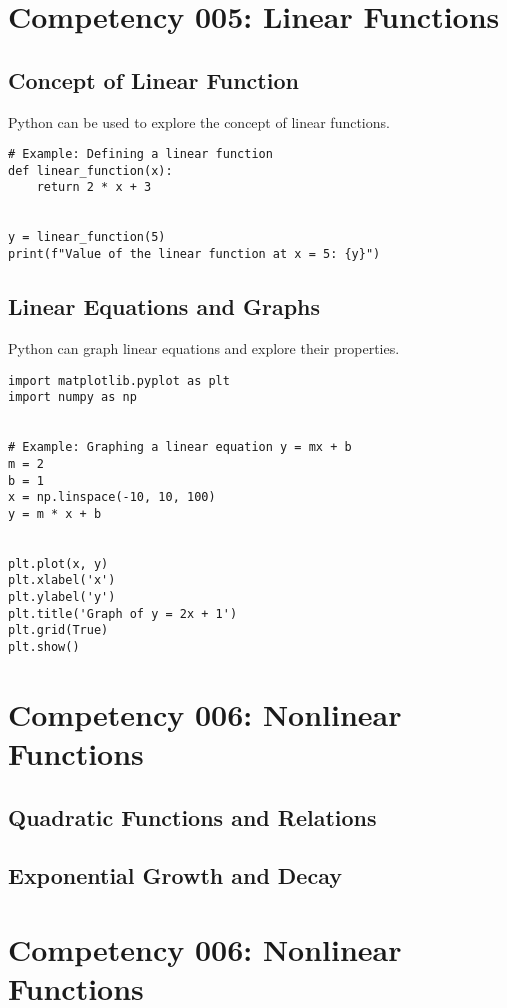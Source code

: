 \documentclass{book}
\begin{document}
\section{Competency 005: Linear Functions}
\subsection{Concept of Linear Function}
Python can be used to explore the concept of linear functions.


\begin{lstlisting}[style=pythonstyle]
# Example: Defining a linear function
def linear_function(x):
    return 2 * x + 3


y = linear_function(5)
print(f"Value of the linear function at x = 5: {y}")
\end{lstlisting}


\subsection{Linear Equations and Graphs}
Python can graph linear equations and explore their properties.


\begin{lstlisting}[style=pythonstyle]
import matplotlib.pyplot as plt
import numpy as np


# Example: Graphing a linear equation y = mx + b
m = 2
b = 1
x = np.linspace(-10, 10, 100)
y = m * x + b


plt.plot(x, y)
plt.xlabel('x')
plt.ylabel('y')
plt.title('Graph of y = 2x + 1')
plt.grid(True)
plt.show()
\end{lstlisting}



\section{Competency 006: Nonlinear Functions}
\subsection{Quadratic Functions and Relations}
\subsection{Exponential Growth and Decay}



\section{Competency 006: Nonlinear Functions}
\end{document}
